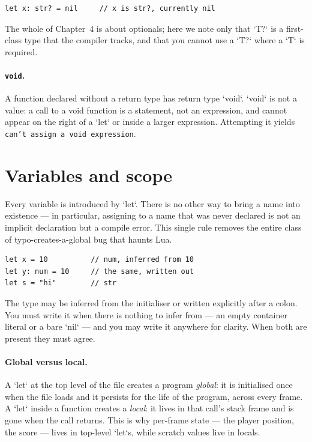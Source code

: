 \begin{lstlisting}[language=wick]
let x: str? = nil     // x is str?, currently nil
\end{lstlisting}

\noindent
The whole of Chapter~4 is about optionals; here we note only that `T?` is a
first-class type that the compiler tracks, and that you cannot use a `T?`
where a `T` is required.

\paragraph{\texttt{void}.} A function declared without a return type has
return type `void`. `void` is not a value: a call to a void function is a
statement, not an expression, and cannot appear on the right of a `let` or
inside a larger expression. Attempting it yields
\texttt{can't assign a void expression}.

\section{Variables and scope}

Every variable is introduced by `let`. There is no other way to bring a name
into existence --- in particular, assigning to a name that was never declared
is not an implicit declaration but a compile error. This single rule removes
the entire class of typo-creates-a-global bug that haunts Lua.

\begin{lstlisting}[language=wick]
let x = 10          // num, inferred from 10
let y: num = 10     // the same, written out
let s = "hi"        // str
\end{lstlisting}

\noindent
The type may be inferred from the initialiser or written explicitly after a
colon. You must write it when there is nothing to infer from --- an empty
container literal or a bare `nil` --- and you may write it anywhere for clarity.
When both are present they must agree.

\paragraph{Global versus local.} A `let` at the top level of the file creates
a program \emph{global}: it is initialised once when the file loads and it
persists for the life of the program, across every frame. A `let` inside a
function creates a \emph{local}: it lives in that call's stack frame and is
gone when the call returns. This is why per-frame state --- the player
position, the score --- lives in top-level `let`s, while scratch values live in
locals.

